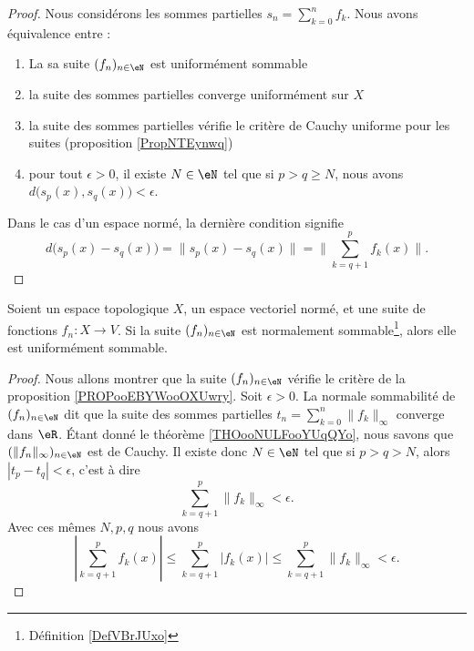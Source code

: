 \begin{proof}
	Nous considérons les sommes partielles \( s_n=\sum_{k=0}^nf_k\). Nous avons équivalence entre :
	\begin{enumerate}
		\item
		      La sa suite \( (f_n)_{n\in \eN}\) est uniformément sommable
		\item
		      la suite des sommes partielles converge uniformément sur \( X\)
		\item
		      la suite des sommes partielles vérifie le critère de Cauchy uniforme pour les suites (proposition \ref{PropNTEynwq})
		\item
		      pour tout \( \epsilon>0\), il existe \( N\in \eN\) tel que si \( p>q\geq N\), nous avons \( d\big( s_p(x),s_q(x) \big)<\epsilon\).
	\end{enumerate}
	Dans le cas d'un espace normé, la dernière condition signifie
	\begin{equation}
		d\big( s_p(x)-s_q(x) \big)=\| s_p(x)-s_q(x) \|=\| \sum_{k=q+1}^pf_k(x) \|.
	\end{equation}
\end{proof}


\begin{lemma}       \label{LEMooJZTBooIopLok}
	Soient un espace topologique \( X\), un espace vectoriel normé, et une suite de fonctions \( f_n\colon X\to V\). Si la suite \( (f_n)_{n\in \eN}\) est normalement sommable\footnote{Définition \ref{DefVBrJUxo}}, alors elle est uniformément sommable.
\end{lemma}

\begin{proof}
	Nous allons montrer que la suite \( (f_n)_{n\in \eN}\) vérifie le critère de la proposition \ref{PROPooEBYWooOXUwry}. Soit \( \epsilon>0\). La normale sommabilité de \( (f_n)_{n\in \eN} \) dit que la suite des sommes partielles \( t_n=\sum_{k=0}^n\| f_k \|_{\infty}\) converge dans \( \eR\). Étant donné le théorème \ref{THOooNULFooYUqQYo}, nous savons que \( (\| f_n \|_{\infty})_{n\in \eN}\) est de Cauchy. Il existe donc \( N\in \eN\) tel que si \( p>q>N\), alors \( | t_p-t_q |<\epsilon\), c'est à dire
	\begin{equation}
		\sum_{k=q+1}^p\| f_k \|_{\infty}<\epsilon.
	\end{equation}
	Avec ces mêmes \( N,p,q\) nous avons
	\begin{equation}
		| \sum_{k=q+1}^pf_k(x) |\leq\sum_{k=q+1}^p| f_k(x) |\leq\sum_{k=q+1}^p\| f_k \|_{\infty}<\epsilon.
	\end{equation}
\end{proof}

